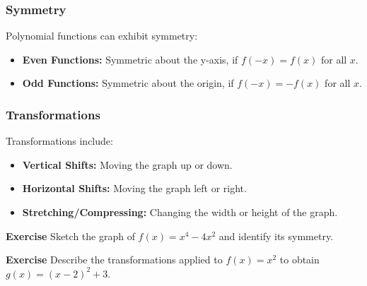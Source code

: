 \documentclass[a4paper,12pt]{book}
\newenvironment{exercise}[1][]
  {\par\medskip\noindent\textbf{Exercise #1} \rmfamily}
  {\medskip}
\begin{document}
\subsubsection{Symmetry}
Polynomial functions can exhibit symmetry:
\begin{itemize}
    \item \textbf{Even Functions:} Symmetric about the y-axis, if \( f(-x) = f(x) \) for all \( x \).
    \item \textbf{Odd Functions:} Symmetric about the origin, if \( f(-x) = -f(x) \) for all \( x \).
\end{itemize}

\subsubsection{Transformations}
Transformations include:
\begin{itemize}
    \item \textbf{Vertical Shifts:} Moving the graph up or down.
    \item \textbf{Horizontal Shifts:} Moving the graph left or right.
    \item \textbf{Stretching/Compressing:} Changing the width or height of the graph.
\end{itemize}

\begin{center}
\end{center}

\begin{exercise}
Sketch the graph of \( f(x) = x^4 - 4x^2 \) and identify its symmetry.
\end{exercise}

\begin{exercise}
Describe the transformations applied to \( f(x) = x^2 \) to obtain \( g(x) = (x - 2)^2 + 3 \).
\end{exercise}

\end{document}
